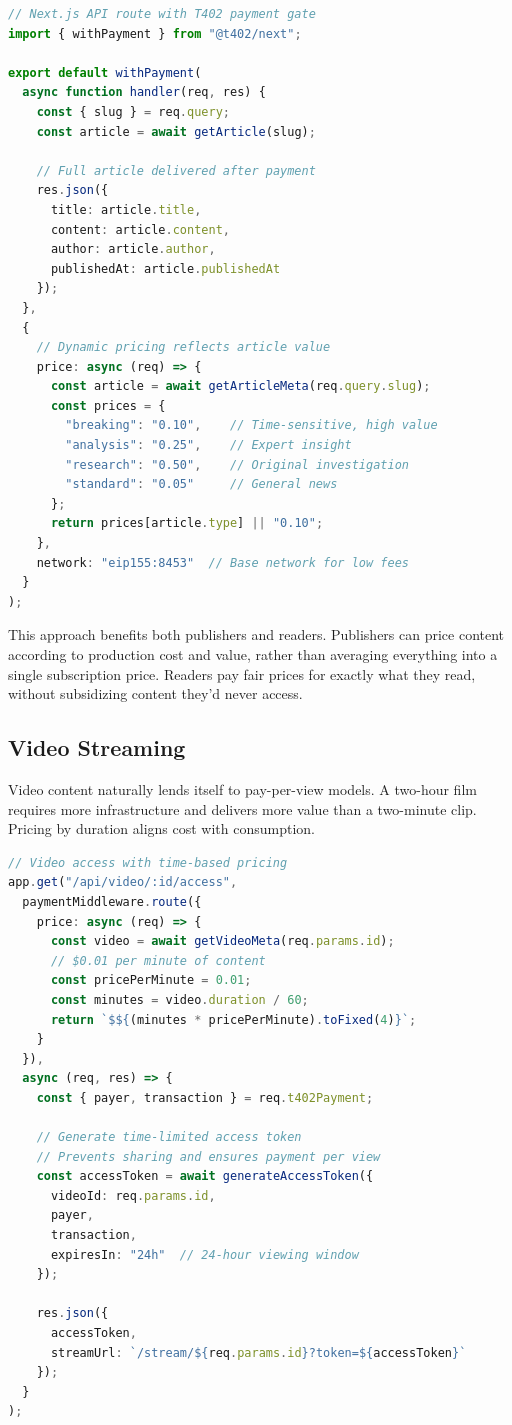 \begin{lstlisting}[language=typescript,caption={News paywall with value-based dynamic pricing}]
// Next.js API route with T402 payment gate
import { withPayment } from "@t402/next";

export default withPayment(
  async function handler(req, res) {
    const { slug } = req.query;
    const article = await getArticle(slug);

    // Full article delivered after payment
    res.json({
      title: article.title,
      content: article.content,
      author: article.author,
      publishedAt: article.publishedAt
    });
  },
  {
    // Dynamic pricing reflects article value
    price: async (req) => {
      const article = await getArticleMeta(req.query.slug);
      const prices = {
        "breaking": "0.10",    // Time-sensitive, high value
        "analysis": "0.25",    // Expert insight
        "research": "0.50",    // Original investigation
        "standard": "0.05"     // General news
      };
      return prices[article.type] || "0.10";
    },
    network: "eip155:8453"  // Base network for low fees
  }
);
\end{lstlisting}

This approach benefits both publishers and readers. Publishers can price content according to production cost and value, rather than averaging everything into a single subscription price. Readers pay fair prices for exactly what they read, without subsidizing content they'd never access.

\subsection{Video Streaming}

Video content naturally lends itself to pay-per-view models. A two-hour film requires more infrastructure and delivers more value than a two-minute clip. Pricing by duration aligns cost with consumption.

\begin{lstlisting}[language=typescript,caption={Pay-per-view video with duration-based pricing}]
// Video access with time-based pricing
app.get("/api/video/:id/access",
  paymentMiddleware.route({
    price: async (req) => {
      const video = await getVideoMeta(req.params.id);
      // $0.01 per minute of content
      const pricePerMinute = 0.01;
      const minutes = video.duration / 60;
      return `$${(minutes * pricePerMinute).toFixed(4)}`;
    }
  }),
  async (req, res) => {
    const { payer, transaction } = req.t402Payment;

    // Generate time-limited access token
    // Prevents sharing and ensures payment per view
    const accessToken = await generateAccessToken({
      videoId: req.params.id,
      payer,
      transaction,
      expiresIn: "24h"  // 24-hour viewing window
    });

    res.json({
      accessToken,
      streamUrl: `/stream/${req.params.id}?token=${accessToken}`
    });
  }
);
\end{lstlisting}

